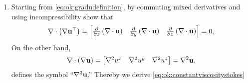 \renewcommand{\labelenumi}{\arabic{chapter}.\arabic{enumi}\quad}
\begin{enumerate}
\item \label{exer:ok:constantviscositystokes}  Starting from \eqref{eq:ok:gradudefinition}, by commuting mixed derivatives and using incompressibility show that
\begin{equation*}
\nabla\cdot \left(\nabla \mathbf{u}^{\top}\right) = \begin{bmatrix}
    \frac{\partial}{\partial x}\left(\nabla\cdot \mathbf{u}\right) & \frac{\partial}{\partial y }\left(\nabla\cdot \mathbf{u}\right) & \frac{\partial}{\partial x} \left(\nabla\cdot \mathbf{u}\right)
    \end{bmatrix}
    = 0.
\end{equation*}
On the other hand,
\begin{equation*}
\nabla\cdot \left(\nabla \mathbf{u}\right) = \begin{bmatrix} \nabla^2 u^x & \nabla^2 u^y & \nabla^2 u^z \end{bmatrix} = \nabla^2 \mathbf{u}.
\end{equation*}
defines the symbol ``$\nabla^2 \mathbf{u}$.''  Thereby we derive \eqref{eq:ok:constantviscositystokes}
\end{enumerate}
